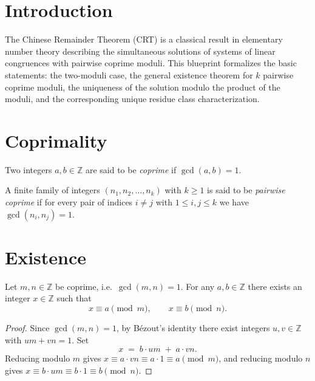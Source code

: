 


\section{Introduction}

The Chinese Remainder Theorem (CRT) is a classical result in elementary number
theory describing the simultaneous solutions of systems of linear congruences
with pairwise coprime moduli. This blueprint formalizes the basic statements:
the two-moduli case, the general existence theorem for $k$ pairwise coprime
moduli, the uniqueness of the solution modulo the product of the moduli, and
the corresponding unique residue class characterization.

\section{Coprimality}

\begin{definition}
    \label{def:coprime}
    Two integers $a, b \in \mathbb{Z}$ are said to be \emph{coprime} if
    $\gcd(a, b) = 1$.
\end{definition}

\begin{definition}
    \label{def:pairwise-coprime}
    A finite family of integers $(n_1, n_2, \ldots, n_k)$ with $k \geq 1$ is
    said to be \emph{pairwise coprime} if for every pair of indices
    $i \neq j$ with $1 \leq i, j \leq k$ we have $\gcd(n_i, n_j) = 1$.
\end{definition}

\section{Existence}

\begin{lemma}
    \label{lem:crt-two}
    Let $m, n \in \mathbb{Z}$ be coprime, i.e.\ $\gcd(m, n) = 1$. For any
    $a, b \in \mathbb{Z}$ there exists an integer $x \in \mathbb{Z}$ such that
    \[
        x \equiv a \pmod{m}, \qquad x \equiv b \pmod{n}.
    \]
\end{lemma}
\begin{proof}
    Since $\gcd(m, n) = 1$, by Bézout's identity there exist integers
    $u, v \in \mathbb{Z}$ with $u m + v n = 1$. Set
    \[
        x \;=\; b \cdot u m \;+\; a \cdot v n.
    \]
    Reducing modulo $m$ gives $x \equiv a \cdot v n \equiv a \cdot 1 \equiv a
    \pmod m$, and reducing modulo $n$ gives $x \equiv b \cdot u m \equiv b
    \cdot 1 \equiv b \pmod n$.
\end{proof}

